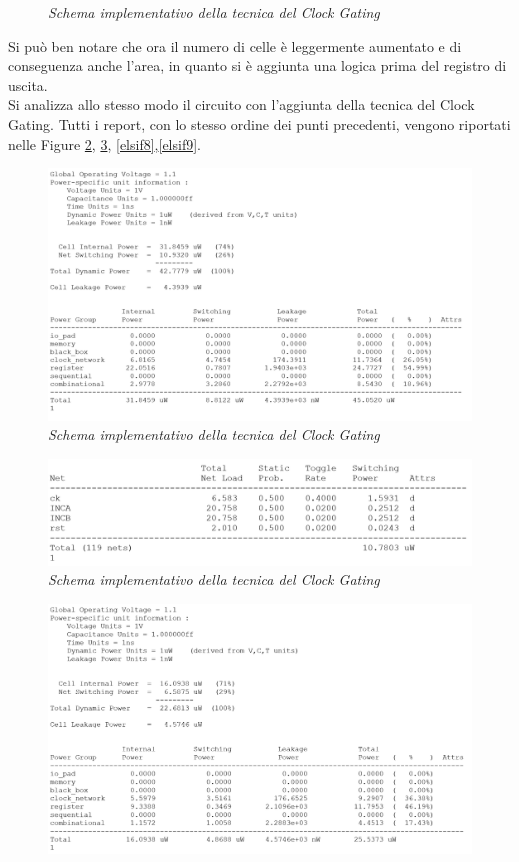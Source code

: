 {\begin{figure}[!htb]
	\caption{\textit{Schema implementativo della tecnica del Clock Gating}}
	\label{elsif5}
\end{figure}
\noindent Si può ben notare che ora il numero di celle è leggermente aumentato e di conseguenza anche l'area, in quanto si è aggiunta una logica prima del registro di uscita.\\
Si analizza allo stesso modo il circuito con l'aggiunta della tecnica del Clock Gating. Tutti i report, con lo stesso ordine dei punti precedenti, vengono riportati nelle Figure \ref{elsif6}, \ref{elsif7}, \ref{elsif8},\ref{elsif9}.\\
\begin{figure}[!htb]
	\centering
	\includegraphics[scale=0.65]{immagini/elsif6}
	\caption{\textit{Schema implementativo della tecnica del Clock Gating}}
	\label{elsif6}
\end{figure}
\begin{figure}[!htb]
	\centering
	\includegraphics[scale=0.65]{immagini/elsif7}
	\caption{\textit{Schema implementativo della tecnica del Clock Gating}}
	\label{elsif7}
\end{figure}
\begin{figure}[!htb]
	\centering
	\includegraphics[scale=0.65]{immagini/elsif8}

\end{figure}}
